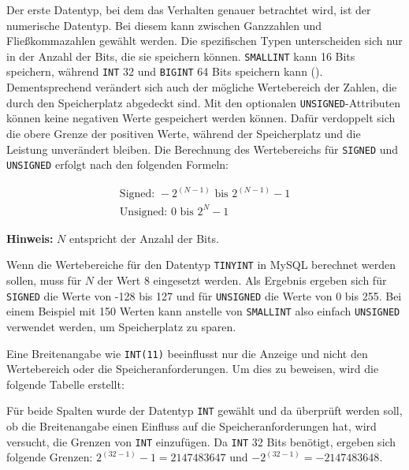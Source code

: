 Der erste Datentyp, bei dem das Verhalten genauer betrachtet wird, ist der numerische Datentyp.
Bei diesem kann zwischen Ganzzahlen und Fließkommazahlen gewählt werden.
Die spezifischen Typen unterscheiden sich nur in der Anzahl der Bits, die sie speichern können.
\texttt{SMALLINT} kann 16 Bits speichern, während \texttt{INT} 32 und \texttt{BIGINT} 64 Bits speichern kann (\cite{mysql_data_types_numeric}).
Dementsprechend verändert sich auch der mögliche Wertebereich der Zahlen, die durch den Speicherplatz abgedeckt sind.
Mit den optionalen \texttt{UNSIGNED}-Attributen können keine negativen Werte gespeichert werden können.
Dafür verdoppelt sich die obere Grenze der positiven Werte, während der Speicherplatz und die Leistung unverändert bleiben.
Die Berechnung des Wertebereichs für \texttt{SIGNED} und \texttt{UNSIGNED} erfolgt nach den folgenden Formeln:

\vspace{-27pt}
\begin{gather}
    \text{Signed: } -2^{(N-1)} \text{ bis } 2^{(N-1)} - 1\label{eq:equation-signed} \\
    \text{Unsigned: } 0 \text{ bis } 2^N - 1\label{eq:equation-unsigned}
\end{gather}

\vspace{-10pt}
\textbf{Hinweis:} $N$ entspricht der Anzahl der Bits.

Wenn die Wertebereiche für den Datentyp \texttt{TINYINT} in MySQL berechnet werden sollen, muss für $N$ der Wert 8 eingesetzt werden.
Als Ergebnis ergeben sich für \texttt{SIGNED} die Werte von -128 bis 127 und für \texttt{UNSIGNED} die Werte von 0 bis 255.
Bei einem Beispiel mit 150 Werten kann anstelle von \texttt{SMALLINT} also einfach \texttt{UNSIGNED} verwendet werden, um Speicherplatz zu sparen.

Eine Breitenangabe wie \texttt{INT(11)} beeinflusst nur die Anzeige und nicht den Wertebereich oder die Speicheranforderungen.
Um dies zu beweisen, wird die folgende Tabelle erstellt:


\vspace{-7pt}

Für beide Spalten wurde der Datentyp \texttt{INT} gewählt und da überprüft werden soll, ob die Breitenangabe einen Einfluss auf die Speicheranforderungen hat, wird versucht, die Grenzen von \texttt{INT} einzufügen.
Da \texttt{INT} 32 Bits benötigt, ergeben sich folgende Grenzen: $2^{(32-1)} - 1 = 2147483647$ und $-2^{(32-1)} = -2147483648$.

